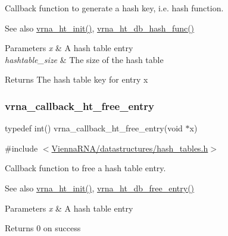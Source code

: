 Callback function to generate a hash key, i.\+e. hash function. 

\begin{DoxySeeAlso}{See also}
\hyperlink{group__hash__table__utils_ga37d1c7e13087a2b7c1b87fda34577c29}{vrna\+\_\+ht\+\_\+init()}, \hyperlink{group__hash__table__utils_gad133721a3cd2f8ca259fe315d86035a7}{vrna\+\_\+ht\+\_\+db\+\_\+hash\+\_\+func()} 
\end{DoxySeeAlso}

\begin{DoxyParams}{Parameters}
{\em x} & A hash table entry \\
\hline
{\em hashtable\+\_\+size} & The size of the hash table \\
\hline
\end{DoxyParams}
\begin{DoxyReturn}{Returns}
The hash table key for entry {\ttfamily x} 
\end{DoxyReturn}
\mbox{\label{group__hash__table__utils_ga3ff18cc70db8bb6f8cfee2c2b1542afc}} 
\subsubsection{\texorpdfstring{vrna\+\_\+callback\+\_\+ht\+\_\+free\+\_\+entry}{vrna\_callback\_ht\_free\_entry}}
{\footnotesize\ttfamily typedef int() vrna\+\_\+callback\+\_\+ht\+\_\+free\+\_\+entry(void $\ast$x)}



{\ttfamily \#include $<$\hyperlink{hash__tables_8h}{Vienna\+R\+N\+A/datastructures/hash\+\_\+tables.\+h}$>$}



Callback function to free a hash table entry. 

\begin{DoxySeeAlso}{See also}
\hyperlink{group__hash__table__utils_ga37d1c7e13087a2b7c1b87fda34577c29}{vrna\+\_\+ht\+\_\+init()}, \hyperlink{group__hash__table__utils_gabcdcd0d070b3dfd2634a09e7838acf66}{vrna\+\_\+ht\+\_\+db\+\_\+free\+\_\+entry()} 
\end{DoxySeeAlso}

\begin{DoxyParams}{Parameters}
{\em x} & A hash table entry \\
\hline
\end{DoxyParams}
\begin{DoxyReturn}{Returns}
0 on success 
\end{DoxyReturn}


